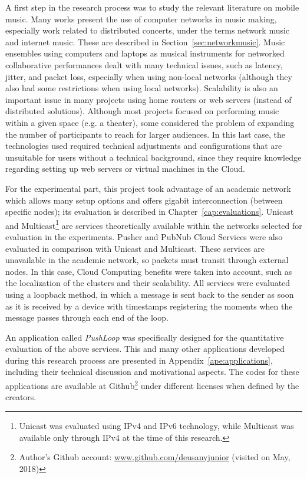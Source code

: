 A first step in the research process was to study the relevant literature on mobile music.
Many works present the use of computer networks in music making, especially work related to distributed concerts, under the terms network music and internet music.
These are described in Section~\ref{sec:networkmusic}.
Music ensembles using computers and laptops as musical instruments for networked collaborative performances dealt with many technical issues, such as latency, jitter, and packet loss, especially when using non-local networks (although they also had some restrictions when using local networks).
Scalability is also an important issue in many projects using home routers or web servers (instead of distributed solutions).
Although most projects focused on performing music within a given space (e.g. a theater), some considered the problem of expanding the number of participants to reach for larger audiences.
In this last case, the technologies used required technical adjustments and configurations that are unsuitable for users without a technical background, since they require knowledge regarding setting up web servers or virtual machines in the Cloud.

For the experimental part, this project took advantage of an academic network which allows many setup options and offers gigabit interconnection (between specific nodes); its evaluation is described in Chapter~\ref{cap:evaluations}.
Unicast and Multicast\footnote{Unicast was evaluated using IPv4 and IPv6 technology, while Multicast was available only through IPv4 at the time of this research.} are services theoretically available within the networks selected for evaluation in the experiments.
Pusher and PubNub Cloud Services were also evaluated in comparison with Unicast and Multicast.
These services are unavailable in the academic network, so packets must transit through external nodes.
In this case, Cloud Computing benefits were taken into account, such as the localization of the clusters and their scalability.
All services were evaluated using a loopback method, in which a message is sent back to the sender as soon as it is received by a device with timestamps registering the moments when the message passes through each end of the loop.

An application called \textit{PushLoop} was specifically designed for the quantitative evaluation of the above services.
This and many other applications developed during this research process are presented in Appendix~\ref{ape:applications}, including their technical discussion and motivational aspects.
The codes for these applications are available at Github\footnote{Author's Github account: \url{www.github.com/deusanyjunior} (visited on May, 2018)} under different licenses when defined by the creators.

